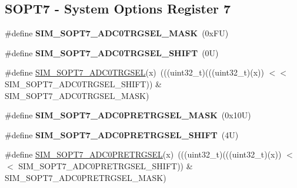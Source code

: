 \subsection*{S\+O\+P\+T7 -\/ System Options Register 7}
\begin{DoxyCompactItemize}
\item 
\mbox{\label{group___s_i_m___register___masks_gaeda70babef834cacace2c775d62bb4ae}} 
\#define {\bfseries S\+I\+M\+\_\+\+S\+O\+P\+T7\+\_\+\+A\+D\+C0\+T\+R\+G\+S\+E\+L\+\_\+\+M\+A\+SK}~(0x\+F\+U)
\item 
\mbox{\label{group___s_i_m___register___masks_ga914ced2a5cf4e7f37371d52d34d4a930}} 
\#define {\bfseries S\+I\+M\+\_\+\+S\+O\+P\+T7\+\_\+\+A\+D\+C0\+T\+R\+G\+S\+E\+L\+\_\+\+S\+H\+I\+FT}~(0\+U)
\item 
\#define \mbox{\hyperlink{group___s_i_m___register___masks_gab4fec73a0cfeecaa863fc29f85326f4a}{S\+I\+M\+\_\+\+S\+O\+P\+T7\+\_\+\+A\+D\+C0\+T\+R\+G\+S\+EL}}(x)~(((uint32\+\_\+t)(((uint32\+\_\+t)(x)) $<$$<$ S\+I\+M\+\_\+\+S\+O\+P\+T7\+\_\+\+A\+D\+C0\+T\+R\+G\+S\+E\+L\+\_\+\+S\+H\+I\+FT)) \& S\+I\+M\+\_\+\+S\+O\+P\+T7\+\_\+\+A\+D\+C0\+T\+R\+G\+S\+E\+L\+\_\+\+M\+A\+SK)
\item 
\mbox{\label{group___s_i_m___register___masks_ga74544c6c9d4fbc593884681ac79c796f}} 
\#define {\bfseries S\+I\+M\+\_\+\+S\+O\+P\+T7\+\_\+\+A\+D\+C0\+P\+R\+E\+T\+R\+G\+S\+E\+L\+\_\+\+M\+A\+SK}~(0x10\+U)
\item 
\mbox{\label{group___s_i_m___register___masks_gaee870f942318f14376ee9e6d5558e2ff}} 
\#define {\bfseries S\+I\+M\+\_\+\+S\+O\+P\+T7\+\_\+\+A\+D\+C0\+P\+R\+E\+T\+R\+G\+S\+E\+L\+\_\+\+S\+H\+I\+FT}~(4\+U)
\item 
\#define \mbox{\hyperlink{group___s_i_m___register___masks_ga32aad79c431ab427d548f59637f16e76}{S\+I\+M\+\_\+\+S\+O\+P\+T7\+\_\+\+A\+D\+C0\+P\+R\+E\+T\+R\+G\+S\+EL}}(x)~(((uint32\+\_\+t)(((uint32\+\_\+t)(x)) $<$$<$ S\+I\+M\+\_\+\+S\+O\+P\+T7\+\_\+\+A\+D\+C0\+P\+R\+E\+T\+R\+G\+S\+E\+L\+\_\+\+S\+H\+I\+FT)) \& S\+I\+M\+\_\+\+S\+O\+P\+T7\+\_\+\+A\+D\+C0\+P\+R\+E\+T\+R\+G\+S\+E\+L\+\_\+\+M\+A\+SK)
\item 
\mbox{\label{group___s_i_m___register___masks_ga6390cd75db35ecc6c5fc6d5b0d417a7d}} 

\end{DoxyCompactItemize}
